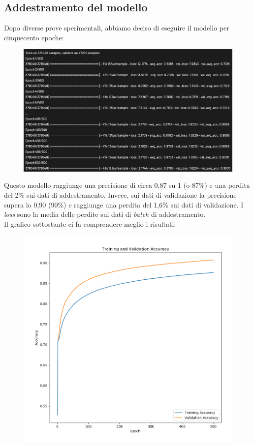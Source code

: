 \subsection{Addestramento del modello}
Dopo diverse prove sperimentali, abbiamo deciso di eseguire il modello per cinquecento epoche:
\begin{figure}[H]
	\centering
	\includegraphics[scale=0.8]{./images/storia.png}
\end{figure}
Questo modello raggiunge una precisione di circa 0,87 su 1 (o 87\%) e una perdita del 2\% sui dati di addestramento. Invece, sui dati di validazione la precisione supera lo 0,90 (90\%) e raggiunge una perdita del 1,6\% sui dati di validazione. I \textit{loss} sono la media delle perdite sui dati di \textit{batch} di addestramento.\\
\newline
Il grafico sottostante ci fa comprendere meglio i risultati:
\begin{figure}[H]
	\centering
	\includegraphics[scale=0.35]{./images/plot.png}
\end{figure}
